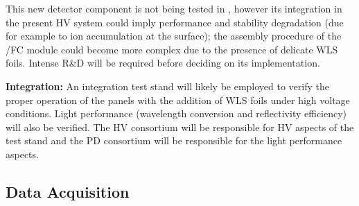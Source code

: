 This new detector component is not being tested in , however its integration in the present  HV system could imply performance and stability degradation (due for example to ion accumulation at the  surface); the assembly procedure of the /FC module could become more complex due to the presence of delicate WLS foils. Intense R\&D will be required before deciding on its implementation.

\textbf{Integration:} An integration test stand will likely be employed to verify the proper operation of the  panels with the addition of WLS foils under high voltage conditions. Light performance (wavelength conversion and reflectivity efficiency) will also be verified. The HV consortium will be responsible for HV aspects of the test stand and the PD consortium will be responsible for the light performance aspects.


\subsection{Data Acquisition}
\label{sec:fdsp-pd-intfc-daq}







